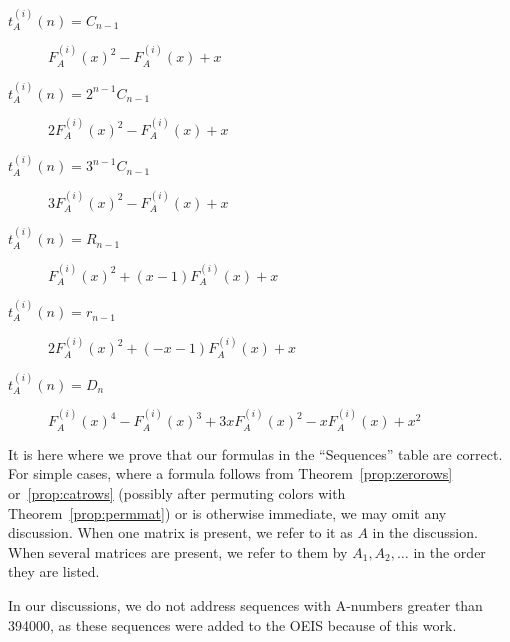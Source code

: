 \documentclass[12pt]{amsart}
\newcommand{\gff}[2]{F_{#2}^{(#1)}(x)}
\newcommand{\gfa}[1]{\gff{#1}{A}}
\begin{document}
\begin{description}
    \begin{description}
        \item[$t^{(i)}_A(n)=C_{n-1}$] $\gfa{i}^2-\gfa{i}+x$
        \item[$t^{(i)}_A(n)=2^{n-1}C_{n-1}$] $2\gfa{i}^2-\gfa{i}+x$
        \item[$t^{(i)}_A(n)=3^{n-1}C_{n-1}$] $3\gfa{i}^2-\gfa{i}+x$
        \item[$t^{(i)}_A(n)=R_{n-1}$] $\gfa{i}^2+(x - 1)\gfa{i}+x$
        \item[$t^{(i)}_A(n)=r_{n-1}$] $2\gfa{i}^2+(-x - 1)\gfa{i}+x$
        \item[$t^{(i)}_A(n)=D_{n}$] $\gfa{i}^4-\gfa{i}^3+3x\gfa{i}^2-x\gfa{i}+x^2$
    \end{description}
    \item[Discussion] It is here where we prove that our formulas in the ``Sequences'' table are correct. For simple cases, where a formula follows from Theorem~\ref{prop:zerorows} or~\ref{prop:catrows} (possibly after permuting colors with Theorem~\ref{prop:permmat}) or is otherwise immediate, we may omit any discussion. When one matrix is present, we refer to it as $A$ in the discussion. When several matrices are present, we refer to them by $A_1,A_2,\ldots$ in the order they are listed.

    In our discussions, we do not address sequences with A-numbers greater than 394000, as these sequences were added to the OEIS because of this work.
\end{description}
\end{document}
